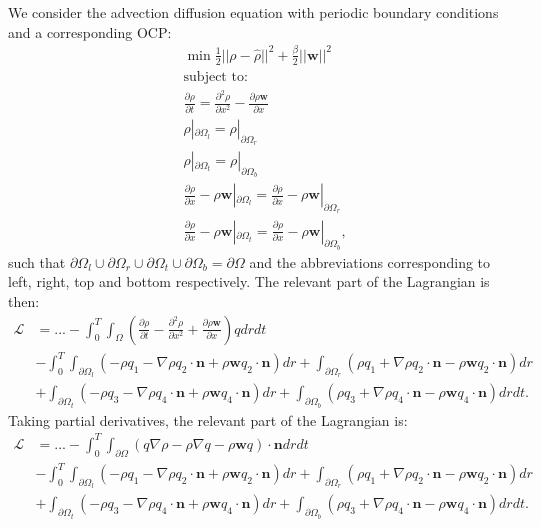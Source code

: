 \documentclass[11pt, a4paper]{article}
\theoremstyle{definition}
\newcommand{\w}{\mathbf{w}}
\newcommand{\n}{\mathbf{n}}
\newcommand{\hr}{\widehat \rho}
\begin{document}
	We consider the advection diffusion equation with periodic boundary conditions and a corresponding OCP:
	\begin{align*}
		&\min \frac{1}{2}|| \rho - \hr||^2 + \frac{\beta}{2}||\w||^2\\
		&\text{subject to:}\\
		&\frac{\partial \rho}{\partial t} = \frac{\partial^2 \rho}{\partial x^2} - \frac{\partial \rho \w}{\partial x}\\
		& \rho|_{\partial \Omega_l} = \rho|_{\partial \Omega_r}\\
		& \rho|_{\partial \Omega_t} = \rho|_{\partial \Omega_b}\\
		& \frac{\partial \rho}{\partial x} - \rho \w |_{\partial \Omega_l}= \frac{\partial \rho}{\partial x}  - \rho \w |_{\partial \Omega_r}\\
		& \frac{\partial \rho}{\partial x} - \rho \w |_{\partial \Omega_t}= \frac{\partial \rho}{\partial x}  - \rho \w |_{\partial \Omega_b},
	\end{align*}
	such that $\partial\Omega_l \cup \partial\Omega_r \cup \partial\Omega_t \cup \partial\Omega_b = \partial \Omega$ and the abbreviations corresponding to left, right, top and bottom respectively.
	The relevant part of the Lagrangian is then:
	\begin{align*}
		\mathcal{L} &= ... -\int_0^T \int_\Omega \left(\frac{\partial \rho}{\partial t} - \frac{\partial^2 \rho}{\partial x^2} + \frac{\partial \rho \w}{\partial x}\right)q dr dt \\
		&- \int_0^T \int_{\partial \Omega_l} \left(- \rho q_1 - \nabla \rho q_2 \cdot \n  + \rho \w q_2 \cdot \n \right) dr  + \int_{\partial \Omega_r} \left(\rho q_1 + \nabla \rho q_2 \cdot \n - \rho \w q_2\cdot \n  \right)  dr  \\
		& + \int_{\partial \Omega_t} \left(- \rho q_3 - \nabla \rho q_4 \cdot \n  + \rho \w q_4 \cdot \n  \right)  dr  + \int_{\partial \Omega_b} \left(\rho q_3 + \nabla \rho q_4 \cdot \n  - \rho \w q_4  \cdot \n \right) drdt.
	\end{align*}
	Taking partial derivatives, the relevant part of the Lagrangian is:
	\begin{align*}
		\mathcal{L} &= ... - \int_0^T \int_{\partial \Omega} \left( q \nabla \rho - \rho\nabla q - \rho \w q \right) \cdot \n  dr dt\\
		&- \int_0^T \int_{\partial \Omega_l} \left(- \rho q_1 - \nabla \rho q_2\cdot \n + \rho \w q_2\cdot \n \right)   dr  + \int_{\partial \Omega_r} \left(\rho q_1 + \nabla \rho q_2 \cdot \n- \rho \w q_2\cdot \n \right)   dr  \\
		& + \int_{\partial \Omega_t} \left(- \rho q_3 - \nabla \rho q_4 \cdot \n + \rho \w q_4 \cdot \n\right) dr  + \int_{\partial \Omega_b} \left(\rho q_3 + \nabla \rho q_4 \cdot \n - \rho \w q_4 \cdot \n \right) drdt.
	\end{align*}
\end{document}
